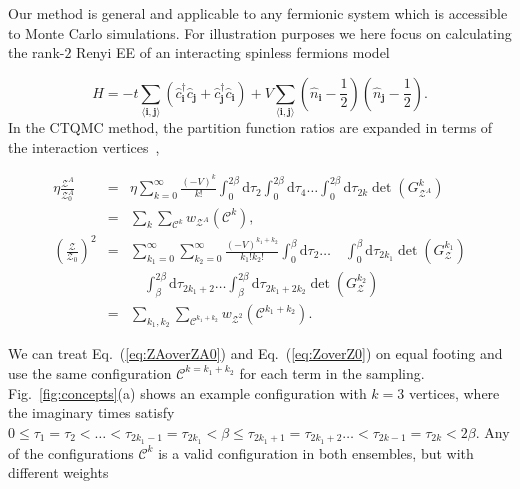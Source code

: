 \documentclass[12pt,onecolumn,english,prl,showpacs,nofootinbib]{revtex4-1}
\begin{document}
Our method is general and applicable to any fermionic system which is accessible to Monte Carlo simulations. For illustration purposes we here focus on calculating the rank-$2$ Renyi EE of an interacting spinless fermions model 

\begin{equation}
 \hat{H}= -t \sum_{\langle \mathbf{i,j}\rangle}\left(  \hat{c}_{\mathbf{i}}^{\dagger} \hat{c}_{\mathbf{j}} +  \hat{c}_{\mathbf{j}}^{\dagger} \hat{c}_{\mathbf{i}}  \right) + V \sum_{\langle \mathbf{i,j} \rangle} \left( \hat{n}_{\mathbf{i}} - \frac{1}{2}
  \right) \left( \hat{n}_{\mathbf{j}} - \frac{1}{2} \right). 
 \label{eq:Ham}
\end{equation} 
In the CTQMC method, the partition function ratios are expanded in terms of the interaction vertices~\cite{Rubtsov:2005iw, Gull:2011jd, CTQMCpaper}, 

\begin{widetext}
\begin{eqnarray}
\eta \frac{\mathcal{Z}^{A}}{\mathcal{Z}_{0}^{A}}  & =& \eta \sum_{k=0}^{\infty} 
\frac{(-V)^{k}}{k!} \int_{0}^{2\beta}\mathrm{d} \tau_{2} \int_{0}^{2\beta}\mathrm{d} \tau_{4}  \ldots \int_{0}^{2\beta} \mathrm{d}\tau_{2k}   \det\left(G^{k}_{\mathcal{Z}^{A}}\right) \label{eq:ZAoverZA0}  \nonumber\\ 
&=&  \sum_{k}\sum_{\mathcal{C}^{k}} w_{\mathcal{Z}^{A}}(\mathcal{C}^{k}), \\   
\left(\frac{\mathcal{Z}}{\mathcal{Z}_{0}}\right)^{2} & =& \sum_{k_{1}=0}^{\infty} \sum_{k_{2}=0}^{\infty} 
\frac{(-V)^{k_{1}+k_{2}}}{k_{1}!k_{2}!}  \int_{0}^{\beta} \mathrm{d}\tau_{2} \ldots \quad\int_{0}^{\beta} \mathrm{d}\tau_{2k_{1}} \det(G_{\mathcal{Z}}^{k_{1}}) \nonumber\\
&& \quad \int_{\beta}^{2\beta} \mathrm{d}\tau_{2k_{1}+2} \ldots \int_{\beta}^{2\beta} \mathrm{d}\tau_{2k_{1}+2k_{2}}\det{(G_{\mathcal{Z}}^{k_{2}})} \nonumber \\& =& \sum_{k_{1},k_{2}}\sum_{\mathcal{C}^{k_{1}+k_{2}}} w_{\mathcal{Z}^{2}}(\mathcal{C}^{k_{1}+k_{2}}).
\label{eq:ZoverZ0}
\end{eqnarray}
\end{widetext}
We can treat Eq.~(\ref{eq:ZAoverZA0}) and Eq.~(\ref{eq:ZoverZ0}) on equal footing and use the same configuration $\mathcal{C}^{k=k_{1}+k_{2}}$ for each term in the sampling.  Fig.~\ref{fig:concepts}(a) shows an example configuration with $k=3$ vertices, where the imaginary times satisfy $0\le\tau_{1}=\tau_{2} < \ldots < \tau_{2k_{1}-1} = \tau_{2k_{1}} < \beta \le \tau_{2k_{1}+1}= \tau_{2k_{1}+2}  \ldots < \tau_{2k-1} = \tau_{2k} < 2\beta $. Any of the configurations $\mathcal{C}^{k}$ is a valid configuration in both ensembles, but with different weights 
\end{document}

